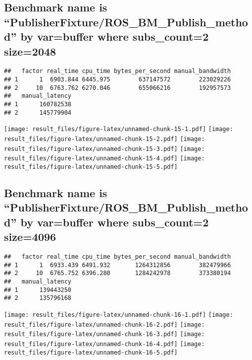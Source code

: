 \documentclass[]{article}
\begin{document}
\hypertarget{benchmark-name-is-publisherfixtureros_bm_publish_method-by-varbuffer-where-subs_count2-size2048}{%
\subsection{Benchmark name is
``PublisherFixture/ROS\_BM\_Publish\_method'' by var=buffer where
subs\_count=2
size=2048}\label{benchmark-name-is-publisherfixtureros_bm_publish_method-by-varbuffer-where-subs_count2-size2048}}

\begin{verbatim}
##   factor real_time cpu_time bytes_per_second manual_bandwidth
## 1      1  6903.844 6445.975        637147572        223029226
## 2     10  6763.762 6270.046        655066216        192957573
##   manual_latency
## 1      160782538
## 2      145779904
\end{verbatim}

\texttt{[image: result\_files/figure-latex/unnamed-chunk-15-1.pdf]}
\texttt{[image: result\_files/figure-latex/unnamed-chunk-15-2.pdf]}
\texttt{[image: result\_files/figure-latex/unnamed-chunk-15-3.pdf]}
\texttt{[image: result\_files/figure-latex/unnamed-chunk-15-4.pdf]}
\texttt{[image: result\_files/figure-latex/unnamed-chunk-15-5.pdf]}

\hypertarget{benchmark-name-is-publisherfixtureros_bm_publish_method-by-varbuffer-where-subs_count2-size4096}{%
\subsection{Benchmark name is
``PublisherFixture/ROS\_BM\_Publish\_method'' by var=buffer where
subs\_count=2
size=4096}\label{benchmark-name-is-publisherfixtureros_bm_publish_method-by-varbuffer-where-subs_count2-size4096}}

\begin{verbatim}
##   factor real_time cpu_time bytes_per_second manual_bandwidth
## 1      1  6933.439 6491.932       1264312856        382479966
## 2     10  6765.752 6396.280       1284242978        373380194
##   manual_latency
## 1      139443250
## 2      135796168
\end{verbatim}

\texttt{[image: result\_files/figure-latex/unnamed-chunk-16-1.pdf]}
\texttt{[image: result\_files/figure-latex/unnamed-chunk-16-2.pdf]}
\texttt{[image: result\_files/figure-latex/unnamed-chunk-16-3.pdf]}
\texttt{[image: result\_files/figure-latex/unnamed-chunk-16-4.pdf]}
\texttt{[image: result\_files/figure-latex/unnamed-chunk-16-5.pdf]}
\end{document}
